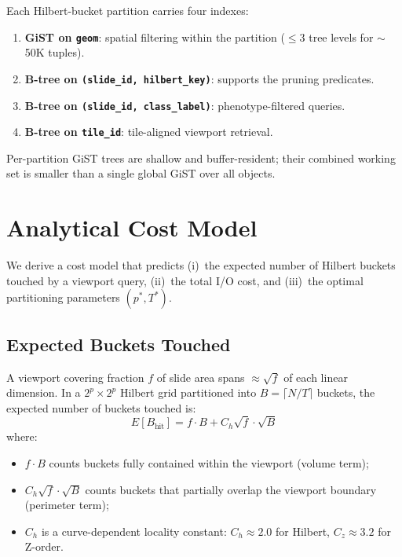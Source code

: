 \documentclass[sigconf]{acmart}
\begin{document}
Each Hilbert-bucket partition carries four indexes:
\begin{enumerate}
\item \textbf{GiST on \texttt{geom}}: spatial filtering within the partition ($\le 3$ tree levels for $\sim$50K tuples).
\item \textbf{B-tree on \texttt{(slide\_id, hilbert\_key)}}: supports the pruning predicates.
\item \textbf{B-tree on \texttt{(slide\_id, class\_label)}}: phenotype-filtered queries.
\item \textbf{B-tree on \texttt{tile\_id}}: tile-aligned viewport retrieval.
\end{enumerate}

Per-partition GiST trees are shallow and buffer-resident; their combined working set is smaller than a single global GiST over all objects.

\section{Analytical Cost Model}
\label{sec:cost_model}

We derive a cost model that predicts (i)~the expected number of Hilbert buckets touched by a viewport query, (ii)~the total I/O cost, and (iii)~the optimal partitioning parameters $(p^*, T^*)$.

\subsection{Expected Buckets Touched}

A viewport covering fraction $f$ of slide area spans $\approx\!\sqrt{f}$ of each linear dimension.
In a $2^p \times 2^p$ Hilbert grid partitioned into $B = \lceil N/T \rceil$ buckets, the expected number of buckets touched is:
\begin{equation}
E[B_{\text{hit}}] = f \cdot B + C_h \sqrt{f} \cdot \sqrt{B}
\label{eq:buckets_touched}
\end{equation}
where:
\begin{itemize}
\item $f \cdot B$ counts buckets fully contained within the viewport (volume term);
\item $C_h \sqrt{f} \cdot \sqrt{B}$ counts buckets that partially overlap the viewport boundary (perimeter term);
\item $C_h$ is a curve-dependent locality constant: $C_h \approx 2.0$ for Hilbert, $C_z \approx 3.2$ for Z-order.
\end{itemize}
\end{document}
